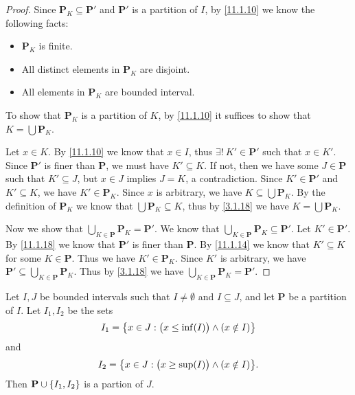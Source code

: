 \begin{proof}
  Since \(\mathbf{P}_K \subseteq \mathbf{P}'\) and \(\mathbf{P}'\) is a partition of \(I\), by \cref{11.1.10} we know the following facts:
  \begin{itemize}
    \item \(\mathbf{P}_K\) is finite.
    \item All distinct elements in \(\mathbf{P}_K\) are disjoint.
    \item All elements in \(\mathbf{P}_K\) are bounded interval.
  \end{itemize}
  To show that \(\mathbf{P}_K\) is a partition of \(K\), by \cref{11.1.10} it suffices to show that \(K = \bigcup \mathbf{P}_K\).

  Let \(x \in K\).
  By \cref{11.1.10} we know that \(x \in I\), thus \(\exists!\ K' \in \mathbf{P}'\) such that \(x \in K'\).
  Since \(\mathbf{P}'\) is finer than \(\mathbf{P}\), we must have \(K' \subseteq K\).
  If not, then we have some \(J \in \mathbf{P}\) such that \(K' \subseteq J\), but \(x \in J\) implies \(J = K\), a contradiction.
  Since \(K' \in \mathbf{P}'\) and \(K' \subseteq K\), we have \(K' \in \mathbf{P}_K\).
  Since \(x\) is arbitrary, we have \(K \subseteq \bigcup \mathbf{P}_K\).
  By the definition of \(\mathbf{P}_K\) we know that \(\bigcup \mathbf{P}_K \subseteq K\), thus by \cref{3.1.18} we have \(K = \bigcup \mathbf{P}_K\).

  Now we show that \(\bigcup_{K \in \mathbf{P}} \mathbf{P}_K = \mathbf{P}'\).
  We know that \(\bigcup_{K \in \mathbf{P}} \mathbf{P}_K \subseteq \mathbf{P}'\).
  Let \(K' \in \mathbf{P}'\).
  By \cref{11.1.18} we know that \(\mathbf{P}'\) is finer than \(\mathbf{P}\).
  By \cref{11.1.14} we know that \(K' \subseteq K\) for some \(K \in \mathbf{P}\).
  Thus we have \(K' \in \mathbf{P}_K\).
  Since \(K'\) is arbitrary, we have \(\mathbf{P}' \subseteq \bigcup_{K \in \mathbf{P}} \mathbf{P}_K\).
  Thus by \cref{3.1.18} we have \(\bigcup_{K \in \mathbf{P}} \mathbf{P}_K = \mathbf{P}'\).
\end{proof}

\begin{ac}\label{ac:11.1.5}
  Let \(I, J\) be bounded intervals such that \(I \neq \emptyset\) and \(I \subseteq J\), and let \(\mathbf{P}\) be a partition of \(I\).
  Let \(I_1, I_2\) be the sets
  \[
    I_1 = \left\lbrace x \in J : \big(x \leq \inf(I)\big) \land (x \notin I)\right\rbrace
  \]
  and
  \[
    I_2 = \set{x \in J : \big(x \geq \sup(I)\big) \land (x \notin I)}.
  \]
  Then \(\mathbf{P} \cup \left\lbrace I_1, I_2\right\rbrace\) is a partion of \(J\).
\end{ac}

